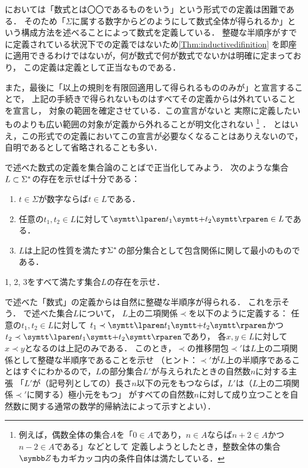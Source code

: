 においては「数式とは〇〇であるものをいう」という形式での定義は困難である．
そのため「\(\Sigma\)に属する数字からどのようにして数式全体が得られるか」という構成方法を述べることによって数式を定義している．
整礎な半順序がすでに定義されている状況下での定義ではないため\cref{Thm:inductivedifinition}
を即座に適用できるわけではないが，何が数式で何が数式でないかは明確に定まっており，
この定義は定義として正当なものである．

また，最後に「以上の規則を有限回適用して得られるもののみが」と宣言することで，
上記の手続きで得られないものはすべてその定義からは外れていることを宣言し，
対象の範囲を確定させている．この宣言がないと
実際に定義したいものよりも広い範囲の対象が定義から外れることが明文化されない
\footnote{%
	例えば，偶数全体の集合\(A\)を「\(0 \in A\)であり，\(n \in A\)ならば\(n + 2 \in A\)かつ\(n - 2 \in A\)である」などとして
	定義しようとしたとき，整数全体の集合\(\Zahlen\)もカギカッコ内の条件自体は満たしている．
}%
．
とはいえ，この形式での定義においてこの宣言が必要なくなることはありえないので，自明であるとして省略されることも多い．

\begin{Que} \label{Que:recursivedefinition}
	で述べた数式の定義を集合論のことばで正当化してみよう．
	次のような集合\(L \subset {\Sigma}^{\ast}\)の存在を示せば十分である：
	\begin{enumerate}
		\item \(t \in \Sigma\)が数字ならば\(t \in L\)である．
		\item 任意の\(t_1, t_2 \in L\)に対して\(\obj{\lparen} t_1 \obj{+} t_2 \obj{\rparen} \in L\)である．
		\item \(L\)は上記の性質を満たす\({\Sigma}^{\ast}\)の部分集合として包含関係に関して最小のものである．
	\end{enumerate}
	1, 2, 3をすべて満たす集合\(L\)の存在を示せ．
\end{Que}

\begin{Que} \label{Que:well-foundedexample}
	で述べた「数式」の定義からは自然に整礎な半順序が得られる．
	これを示そう．
	で述べた集合\(L\)について，
	\(L\)上の二項関係\(\prec\)を以下のように定義する：
	任意の\(t_1, t_2 \in L\)に対して
	\(t_1 \prec \obj{\lparen} t_1 \obj{+} t_2 \obj{\rparen}\)かつ
	\(t_2 \prec \obj{\lparen} t_1 \obj{+} t_2 \obj{\rparen}\)であり，
	各\(x, y \in L\)に対して\(x \prec y\)となるのは上記のみである．
	このとき，\(\prec\)の推移閉包\(\prec'\)は\(L\)上の二項関係として整礎な半順序であることを示せ
	（ヒント：\(\prec'\)が\(L\)上の半順序であることはすぐにわかるので，\(L\)の部分集合\(L'\)が与えられたときの自然数\(n\)に対する主張
	「\(L'\)が（記号列としての）長さ\(n\)以下の元をもつならば，\(L'\)は（\(L\)上の二項関係\(\prec'\)に関する）極小元をもつ」
	がすべての自然数\(n\)に対して成り立つことを自然数に関する通常の数学的帰納法によって示すとよい）．
\end{Que}

